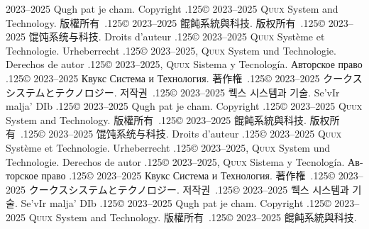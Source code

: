\documentclass{cookbook}
\begin{document}
{{	2023--2025 Qugh pat je cham.
Copyright {\lower.125\baselineskip\hbox{\copyright}}
	2023--2025 \textsc{Quux} System and Technology.
版權所有~{\lower.125\baselineskip\hbox{\copyright}}
	2023--2025 餛飩系統與科技.
版权所有~{\lower.125\baselineskip\hbox{\copyright}}
	2023--2025 馄饨系统与科技.
Droits d'auteur {\lower.125\baselineskip\hbox{\copyright}} %
	2023--2025 \textsc{Quux} Système et Technologie.
Urheberrecht {\lower.125\baselineskip\hbox{\copyright}} %
	2023--2025, \textsc{Quux} System und Technologie.
Derechos de autor {\lower.125\baselineskip\hbox{\copyright}} %
	2023--2025, \textsc{Quux} Sistema y Tecnología.
\foreignlanguage{russian}{Авторское право} %
	{\lower.125\baselineskip\hbox{\copyright}}
	2023–2025 \foreignlanguage{russian}{Квукс Система и Технология.}
著作権~{\lower.125\baselineskip\hbox{\copyright}}
	2023--2025 クークスシステムとテクノロジー.
저작권~{\lower.125\baselineskip\hbox{\copyright}}
	2023--2025 퀙스 시스템과 기술.
Se'vIr malja' DIb {\lower.125\baselineskip\hbox{\copyright}} %
	2023--2025 Qugh pat je cham.
Copyright {\lower.125\baselineskip\hbox{\copyright}}
	2023--2025 \textsc{Quux} System and Technology.
版權所有~{\lower.125\baselineskip\hbox{\copyright}}
	2023--2025 餛飩系統與科技.
版权所有~{\lower.125\baselineskip\hbox{\copyright}}
	2023--2025 馄饨系统与科技.
Droits d'auteur {\lower.125\baselineskip\hbox{\copyright}} %
	2023--2025 \textsc{Quux} Système et Technologie.
Urheberrecht {\lower.125\baselineskip\hbox{\copyright}} %
	2023--2025, \textsc{Quux} System und Technologie.
Derechos de autor {\lower.125\baselineskip\hbox{\copyright}} %
	2023--2025, \textsc{Quux} Sistema y Tecnología.
\foreignlanguage{russian}{Авторское право} %
	{\lower.125\baselineskip\hbox{\copyright}}
	2023–2025 \foreignlanguage{russian}{Квукс Система и Технология.}
著作権~{\lower.125\baselineskip\hbox{\copyright}}
	2023--2025 クークスシステムとテクノロジー.
저작권~{\lower.125\baselineskip\hbox{\copyright}}
	2023--2025 퀙스 시스템과 기술.
Se'vIr malja' DIb {\lower.125\baselineskip\hbox{\copyright}} %
	2023--2025 Qugh pat je cham.
Copyright {\lower.125\baselineskip\hbox{\copyright}}
	2023--2025 \textsc{Quux} System and Technology.
版權所有~{\lower.125\baselineskip\hbox{\copyright}}
	2023--2025 餛飩系統與科技.
}}
\end{document}
